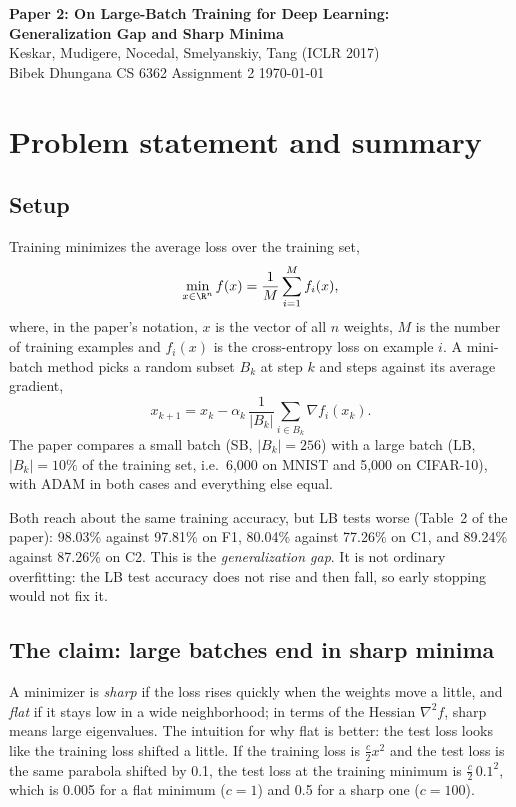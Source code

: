 

\begin{center}
{\LARGE\bfseries Paper 2: On Large-Batch Training for Deep Learning:\\[2pt] Generalization Gap and Sharp Minima}\\[5pt]
{\large Keskar, Mudigere, Nocedal, Smelyanskiy, Tang (ICLR 2017)}\\[4pt]
Bibek Dhungana \quad\textbar\quad CS 6362 Assignment 2 \quad\textbar\quad \today
\end{center}

\section{Problem statement and summary}

\subsection{Setup}
Training minimizes the average loss over the training set,
\[
\min_{x\in\R^n} f(x)=\frac1M\sum_{i=1}^M f_i(x),
\]
where, in the paper's notation, $x$ is the vector of all $n$ weights, $M$ is the number of training examples and $f_i(x)$ is the cross-entropy loss on example $i$. A mini-batch method picks a random subset $B_k$ at step $k$ and steps against its average gradient,
\[
x_{k+1}=x_k-\alpha_k\,\frac{1}{|B_k|}\sum_{i\in B_k}\nabla f_i(x_k).
\]
The paper compares a small batch (SB, $|B_k|=256$) with a large batch (LB, $|B_k|=10\%$ of the training set, i.e.\ 6{,}000 on MNIST and 5{,}000 on CIFAR-10), with ADAM in both cases and everything else equal.

Both reach about the same training accuracy, but LB tests worse (Table~2 of the paper): 98.03\% against 97.81\% on F1, 80.04\% against 77.26\% on C1, and 89.24\% against 87.26\% on C2. This is the \emph{generalization gap}. It is not ordinary overfitting: the LB test accuracy does not rise and then fall, so early stopping would not fix it.

\subsection{The claim: large batches end in sharp minima}
A minimizer is \emph{sharp} if the loss rises quickly when the weights move a little, and \emph{flat} if it stays low in a wide neighborhood; in terms of the Hessian $\nabla^2 f$, sharp means large eigenvalues. The intuition for why flat is better: the test loss looks like the training loss shifted a little. If the training loss is $\tfrac{c}{2}x^2$ and the test loss is the same parabola shifted by 0.1, the test loss at the training minimum is $\tfrac{c}{2}\,0.1^2$, which is 0.005 for a flat minimum ($c=1$) and 0.5 for a sharp one ($c=100$).

